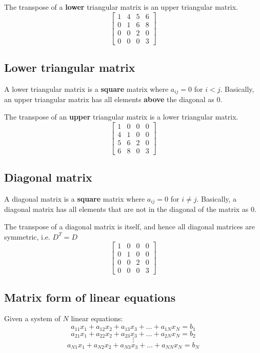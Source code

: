 \documentclass[11pt]{article}
\begin{document}
The transpose of a \textbf{lower} triangular matrix is an upper triangular matrix.
\begin{displaymath}
\begin{bmatrix}
1 & 4 & 5 & 6 \\
0 & 1 & 6 & 8 \\
0 & 0 & 2 & 0 \\
0 & 0 & 0 & 3
\end{bmatrix}
\end{displaymath}

\subsection{Lower triangular matrix}
\label{sec:orgf4ae1b7}
A lower triangular matrix is a \textbf{square} matrix where \(a_{ij} = 0\) for \(i < j\). Basically, an upper triangular matrix has all elements \textbf{above} the diagonal as 0.

The transpose of an \textbf{upper} triangular matrix is a lower triangular matrix.
\begin{displaymath}
\begin{bmatrix}
1 & 0 & 0 & 0 \\
4 & 1 & 0 & 0 \\
5 & 6 & 2 & 0 \\
6 & 8 & 0 & 3
\end{bmatrix}
\end{displaymath}

 \newpage

\subsection{Diagonal matrix}
\label{sec:orgd94fe17}
A diagonal matrix is a \textbf{square} matrix where \(a_{ij} = 0\) for \(i \neq j\). Basically, a diagonal matrix has all elements that are not in the diagonal of the matrix as 0.

The transpose of a diagonal matrix is itself, and hence all diagonal matrices are symmetric, i.e. \(D^{T} = D\)
\begin{displaymath}
\begin{bmatrix}
1 & 0 & 0 & 0 \\
0 & 1 & 0 & 0 \\
0 & 0 & 2 & 0 \\
0 & 0 & 0 & 3
\end{bmatrix}
\end{displaymath}

\subsection{Matrix form of linear equations}
\label{sec:orgaa48eb5}
Given a system of \(N\) linear equations:
\[a_{11}x_1 + a_{12}x_2 + a_{13}x_3 + \ldots + a_{1N}x_{N} = b_1\]
\[a_{21}x_1 + a_{22}x_2 + a_{23}x_3 + \ldots + a_{2N}x_{N} = b_2\]
\[\vdots\]
\[a_{N1}x_1 + a_{N2}x_2 + a_{N3}x_3 + \ldots + a_{NN}x_{N} = b_N\]
\end{document}
